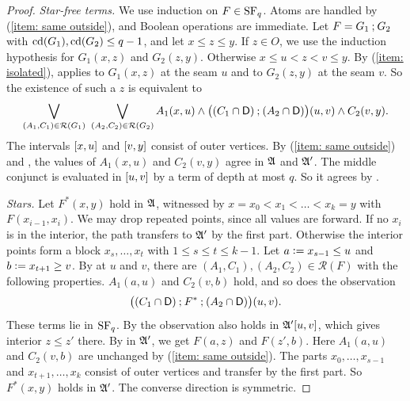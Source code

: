 \begin{proof}
  \emph{Star-free terms.}
  We use induction on $F \in \mathrm{SF}_{q}$.
  Atoms are handled by (\ref{item: same outside}), and Boolean operations are immediate.
  Let $F = G_1 \mathbin{;} G_2$ with $\mathrm{cd}(G_1), \mathrm{cd}(G_2) \le q - 1$, and let $x \le z \le y$.
  If $z \in O$, we use the induction hypothesis for $G_1(x, z)$ and $G_2(z, y)$.
  Otherwise $x \le u < z < v \le y$.
  By (\ref{item: isolated}),  applies to $G_1(x, z)$ at the seam $u$ and to $G_2(z, y)$ at the seam $v$.
  So the existence of such a $z$ is equivalent to
  \[
    \bigvee_{(A_1, C_1) \in \mathcal{R}(G_1)}\ \bigvee_{(A_2, C_2) \in \mathcal{R}(G_2)}
      A_1(x, u) \wedge \bigl((C_1 \cap \mathsf{D}) \mathbin{;} (A_2 \cap \mathsf{D})\bigr)(u, v) \wedge C_2(v, y).
  \]
  The intervals $[x, u]$ and $[v, y]$ consist of outer vertices.
  By (\ref{item: same outside}) and , the values of $A_1(x, u)$ and $C_2(v, y)$ agree in $\mathfrak{A}$ and $\mathfrak{A}'$.
  The middle conjunct is evaluated in $[u, v]$ by a term of depth at most $q$.
  So it agrees by .

  \emph{Stars.}
  Let $F^{*}(x, y)$ hold in $\mathfrak{A}$, witnessed by $x = x_0 < x_1 < \dots < x_k = y$ with $F(x_{i-1}, x_i)$.
  We may drop repeated points, since all values are forward.
  If no $x_i$ is in the interior, the path transfers to $\mathfrak{A}'$ by the first part.
  Otherwise the interior points form a block $x_s, \dots, x_t$ with $1 \le s \le t \le k - 1$.
  Let $a \mathrel{\vcentcolon=} x_{s-1} \le u$ and $b \mathrel{\vcentcolon=} x_{t+1} \ge v$.
  By  at $u$ and $v$, there are $(A_1, C_1), (A_2, C_2) \in \mathcal{R}(F)$ with the following properties.
  $A_1(a, u)$ and $C_2(v, b)$ hold, and so does the observation
  \[
    \bigl((C_1 \cap \mathsf{D}) \mathbin{;} F^{*} \mathbin{;} (A_2 \cap \mathsf{D})\bigr)(u, v).
  \]
  These terms lie in $\mathrm{SF}_{q}$.
  By  the observation also holds in $\mathfrak{A}'[u, v]$, which gives interior $z \le z'$ there.
  By  in $\mathfrak{A}'$, we get $F(a, z)$ and $F(z', b)$.
  Here $A_1(a, u)$ and $C_2(v, b)$ are unchanged by (\ref{item: same outside}).
  The parts $x_0, \dots, x_{s-1}$ and $x_{t+1}, \dots, x_k$ consist of outer vertices and transfer by the first part.
  So $F^{*}(x, y)$ holds in $\mathfrak{A}'$.
  The converse direction is symmetric.
\end{proof}
